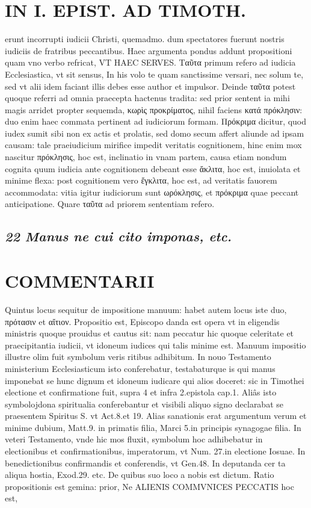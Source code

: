 \documentclass{article}
\begin{document}
\begin{pages}
\section*{IN I. EPIST. AD TIMOTH. }
\marginpar{[ p.137 ]}\pstart erunt incorrupti iudicii Christi, quemadmo. dum spectatores fuerunt nostris iudiciis de fratribus peccantibus. Haec argumenta pondus addunt propositioni quam vno verbo refricat, VT HAEC SERVES.  \pend\pstart Ταῦτα primum refero ad iudicia Ecclesiastica, vt sit sensus, In his volo te quam sanctissime versari, nec solum te, sed vt alii idem faciant illis debes esse author et impulsor. Deinde ταῦτα potest quoque referri ad omnia praecepta hactenus tradita: sed prior sentent ia mihi magis arridet propter sequemda,  κωρὶς προκρίματος, nihil faciens κατά πρόκλησιν: duo enim haec commata pertinent ad iudiciorum formam. Πρόκριμα dicitur, quod iudex sumit sibi non ex actis et prolatis, sed domo secum affert aliunde ad ipsam causam: tale praeiudicium mirifice impedit veritatis cognitionem, hinc enim mox nascitur πρόκλησις, hoc est, inclinatio in vnam partem, causa etiam nondum cognita quum iudicia ante cognitionem debeant esse ἄκλιτα, hoc est, inuiolata et minime flexa: post cognitionem vero ἔγκλιτα, hoc est, ad veritatis fauorem accommodata: vitia igitur iudiciorum sunt ωρόκλησις, et πρόκριμα quae peccant anticipatione. Quare ταῦτα ad priorem sententiam refero.  \pend
{}
{}
\subsection*{\textit{22 Manus ne cui cito imponas, etc. }}
\section*{COMMENTARII }
\marginpar{[ p.138 ]}\pstart Quintus locus sequitur de impositione manuum: habet autem locus iste duo, πρότασιν et αἴτιον. Propositio est, Episcopo danda est opera vt in eligendis ministris quoque prouidus et cautus sit: nam peccatur hic quoque celeritate et praecipitantia iudicii, vt idoneum iudices qui talis minime est. Manuum impositio illustre olim fuit symbolum veris ritibus adhibitum. In nouo Testamento ministerium Ecclesiasticum isto conferebatur, testabaturque is qui manus imponebat se hunc dignum et idoneum iudicare qui alios doceret: sic in Timothei electione et confirmatione fuit, supra 4 et infra 2.epistola cap.1. Aliâs isto symbolojdona spiritualia conferebantur et visibili aliquo signo declarabat se praesentem Spiritus S. vt Act.8.et 19. Alias sanationis erat argumentum verum et minime dubium, Matt.9. in primatis filia, Marci 5.in principis synagogae filia. In veteri Testamento, vnde hic mos fluxit, symbolum hoc adhibebatur in electionibus et confirmationibus, imperatorum, vt Num. 27.in electione Iosuae. In benedictionibus confirmandis et conferendis, vt Gen.48. In deputanda cer ta aliqua hostia, Exod.29. etc. De quibus suo loco a nobis est dictum.  \pend\pstart Ratio propositionis est gemina: prior, Ne ALIENIS COMMVNICES PECCATIS hoc est,  \pend

\end{pages}
\end{document}
